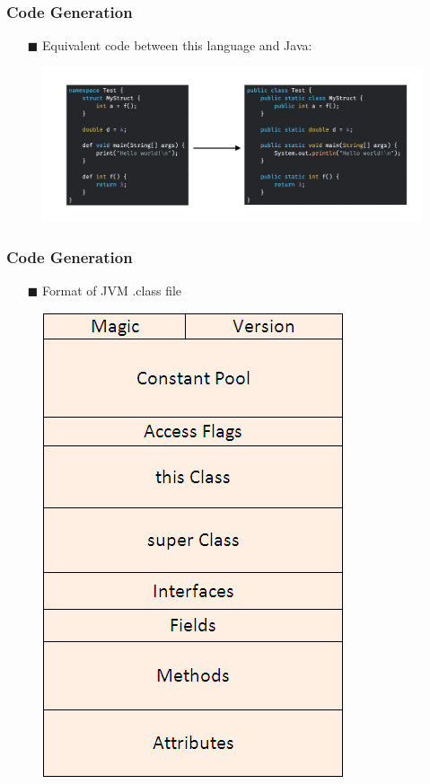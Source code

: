 \documentclass{beamer}
\begin{document}
\begin{frame}
    \frametitle{Code Generation}
        \begin{itemize}
        \item[$\blacksquare$] Equivalent code between this language and Java:
    \end{itemize}
    \begin{figure}[h]
        \centering
        \includegraphics[scale=0.2]{assets/codeConvert.png}
    \end{figure}
\end{frame}

\begin{frame}
    \frametitle{Code Generation}
        \begin{itemize}
        \item[$\blacksquare$] Format of JVM .class file
    \end{itemize}
    \begin{figure}[h]
        \centering
        \includegraphics[scale=0.35]{assets/java-class-file-internal-structure.png}
    \end{figure}
\end{frame}
\end{document}
